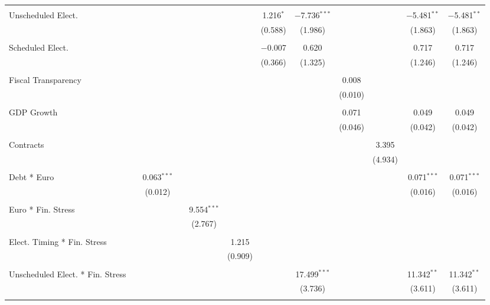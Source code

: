 \begin{table}[!htbp]
\begin{tabular}{@{\extracolsep{5pt}}lccccccccccc}
  & & & & & & & & & & & \\ 
 Unscheduled Elect. &  &  &  &  &  & 1.216$^{*}$ & $-$7.736$^{***}$ &  &  & $-$5.481$^{**}$ & $-$5.481$^{**}$ \\ 
  &  &  &  &  &  & (0.588) & (1.986) &  &  & (1.863) & (1.863) \\ 
  & & & & & & & & & & & \\ 
 Scheduled Elect. &  &  &  &  &  & $-$0.007 & 0.620 &  &  & 0.717 & 0.717 \\ 
  &  &  &  &  &  & (0.366) & (1.325) &  &  & (1.246) & (1.246) \\ 
  & & & & & & & & & & & \\ 
 Fiscal Transparency &  &  &  &  &  &  &  & 0.008 &  &  &  \\ 
  &  &  &  &  &  &  &  & (0.010) &  &  &  \\ 
  & & & & & & & & & & & \\ 
 GDP Growth &  &  &  &  &  &  &  & 0.071 &  & 0.049 & 0.049 \\ 
  &  &  &  &  &  &  &  & (0.046) &  & (0.042) & (0.042) \\ 
  & & & & & & & & & & & \\ 
 Contracts &  &  &  &  &  &  &  &  & 3.395 &  &  \\ 
  &  &  &  &  &  &  &  &  & (4.934) &  &  \\ 
  & & & & & & & & & & & \\ 
 Debt * Euro &  & 0.063$^{***}$ &  &  &  &  &  &  &  & 0.071$^{***}$ & 0.071$^{***}$ \\ 
  &  & (0.012) &  &  &  &  &  &  &  & (0.016) & (0.016) \\ 
  & & & & & & & & & & & \\ 
 Euro * Fin. Stress &  &  &  & 9.554$^{***}$ &  &  &  &  &  &  &  \\ 
  &  &  &  & (2.767) &  &  &  &  &  &  &  \\ 
  & & & & & & & & & & & \\ 
 Elect. Timing * Fin. Stress &  &  &  &  & 1.215 &  &  &  &  &  &  \\ 
  &  &  &  &  & (0.909) &  &  &  &  &  &  \\ 
  & & & & & & & & & & & \\ 
 Unscheduled Elect. * Fin. Stress &  &  &  &  &  &  & 17.499$^{***}$ &  &  & 11.342$^{**}$ & 11.342$^{**}$ \\ 
  &  &  &  &  &  &  & (3.736) &  &  & (3.611) & (3.611) \\ 
  & & & & & & & & & & & \\ 

\end{tabular}
\end{table}
